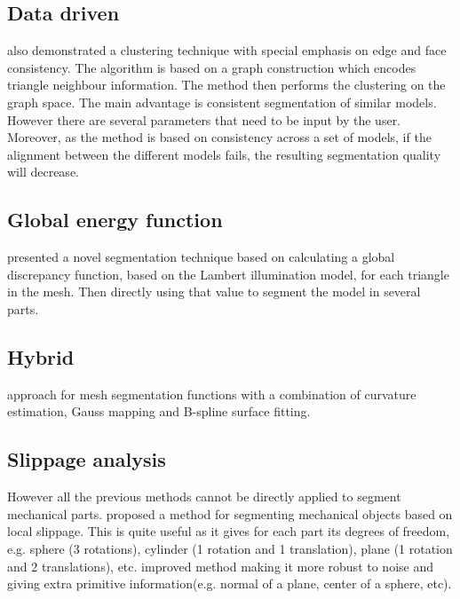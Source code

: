 \subsection{Data driven}

\cite{Golovinskiy2009} also demonstrated a clustering technique with special emphasis on edge and face consistency.
The algorithm is based on a graph construction which encodes triangle neighbour information.
The method then performs the clustering on the graph space.
The main advantage is consistent segmentation of similar models.
However there are several parameters that need to be input by the user.
Moreover, as the method is based on consistency across a set of models, if the alignment between the different models fails, the resulting segmentation quality will decrease. 

\subsection{Global energy function}

\cite{DeCastro2014} presented a novel segmentation technique based on calculating a global discrepancy function, based on the Lambert illumination model, for each triangle in the mesh.
Then directly using that value to segment the model in several parts.

\subsection{Hybrid}

\cite{Wang2011} approach for mesh segmentation functions with a combination of curvature estimation, Gauss mapping and B-spline surface fitting.

\subsection{Slippage analysis}
\label{SlippageAnalysis}

However all the previous methods cannot be directly applied to segment mechanical parts.
\cite{Gelfand2004} proposed a method for segmenting mechanical objects based on local slippage.
This is quite useful as it gives for each part its degrees of freedom, e.g. sphere (3 rotations), cylinder (1 rotation and 1 translation), plane (1 rotation and 2 translations), etc.
\cite{Yi2014} improved \cite{Gelfand2004} method making it more robust to noise and giving extra primitive information(e.g. normal of a plane, center of a sphere, etc).

